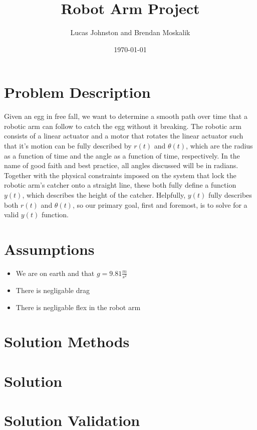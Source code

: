 \documentclass{article}
\title{Robot Arm Project}
\author{Lucas Johnston and Brendan Moskalik}
\date{\today}
\begin{document}
    \maketitle

    \section*{Problem Description}
    
    \tab Given an egg in free fall, we want to determine a smooth path over time that a robotic arm can follow to catch the egg without it breaking. The robotic arm consists of a linear actuator and a motor that rotates the linear actuator such that it's motion can be fully described by $r\left(t\right)$ and $\theta\left(t\right)$, which are the radius as a function of time and the angle as a function of time, respectively. In the name of good faith and best practice, all angles discussed will be in radians. Together with the physical constraints imposed on the system that lock the robotic arm's catcher onto a straight line, these both fully define a function $y\left(t\right)$, which describes the height of the catcher. Helpfully, $y\left(t\right)$ fully describes both $r\left(t\right)$ and $\theta\left(t\right)$, so our primary goal, first and foremost, is to solve for a valid $y\left(t\right)$ function.
     
	\section*{Assumptions}
	
	\begin{itemize}
		\item We are on earth and that $g = 9.81 \frac{m}{s^2}$
		\item There is negligable drag
		\item There is negligable flex in the robot arm
	\end{itemize}
	
	\section*{Solution Methods}
	
	\section*{Solution}
	
	\section*{Solution Validation}
	
\end{document}
